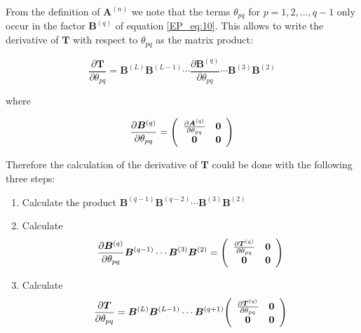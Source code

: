 \documentclass[preprint,amsmath,amssymb,superscriptaddress,showpacs,pre]{revtex4-1}
\let\originalleft\left
\let\originalright\right
\renewcommand{\left}{\mathopen{}\mathclose\bgroup\originalleft}
\renewcommand{\right}{\aftergroup\egroup\originalright}
\begin{document}
From the definition of $\bm A^{(n)} $ we note that the terms $\theta_{pq}$ for $p=1,2,...,q-1$ only occur in the factor $\bm B^{(q)}$ of equation \eqref{EP_eq:10}. 
This allows to write  the derivative of $\bm T$ with respect to $\theta_{pq}$  as the matrix product:

\begin{equation}
 \frac{\partial \bm T}{\partial \theta_{pq}}= \bm B^{(L)} \bm B^{(L-1)}\cdots \frac{\partial \bm B^{(q)}}{\partial \theta_{pq} }\cdots\bm B^{(3)}\bm B^{(2)}   
\label{EP_eq:12}
\end{equation}

where 

\begin{equation} 
 \frac{\partial \bm B^{(q)}}{\partial \theta_{pq} } =  \left(
\begin{array}{cc}
 \frac{\partial\bm A^{(q)}}{\partial \theta_{pq}  } & \bm 0  \\
 \bm 0 &  \bm 0\\
\end{array}
\right)
\label{EP_eq:13}
\end{equation}


Therefore  the calculation of the derivative of $\bm T$ could be done with the following three steps:
\begin{enumerate}
\item Calculate the product $\bm B^{(q-1)}\bm B^{(q-2)}\cdots\bm B^{(3)}\bm B^{(2)}   $
\item  Calculate \begin{equation}
\frac{\partial \bm B^{(q)}}{\partial \theta_{pq} }\bm B^{(q-1)}\cdots\bm B^{(3)}\bm B^{(2)}   = \left(
\begin{array}{cc}
\frac{\partial\bm T^{(q)}}{\partial \theta_{pq}  } & \bm 0  \\
\bm 0 &  \bm 0\\
\end{array}
\right) 
\label{EP_eq:14}
\end{equation}

\item Calculate \begin{equation}
\frac{\partial\bm T}{\partial \theta_{pq}  }=\bm B^{(L)}\bm B^{(L-1)}\cdots \bm B^{(q+1)} \left(
\begin{array}{cc}
\frac{\partial\bm T^{(q)}}{\partial \theta_{pq}  } & \bm 0  \\
\bm 0 &  \bm 0\\
\end{array}
\right) 
\label{EP_eq:15}
\end{equation}

\end{enumerate}
\end{document}
